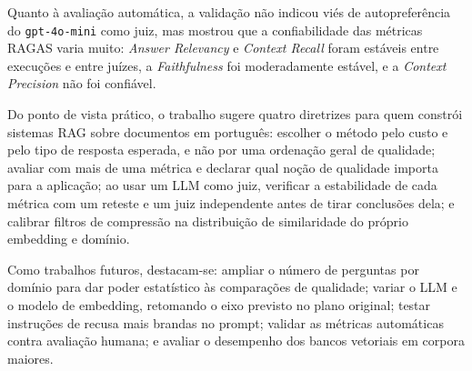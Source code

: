 Quanto à avaliação automática, a validação não indicou viés de autopreferência do \texttt{gpt-4o-mini} como juiz, mas mostrou que a confiabilidade das métricas RAGAS varia muito: \emph{Answer Relevancy} e \emph{Context Recall} foram estáveis entre execuções e entre juízes, a \emph{Faithfulness} foi moderadamente estável, e a \emph{Context Precision} não foi confiável.

Do ponto de vista prático, o trabalho sugere quatro diretrizes para quem constrói sistemas RAG sobre documentos em português: escolher o método pelo custo e pelo tipo de resposta esperada, e não por uma ordenação geral de qualidade; avaliar com mais de uma métrica e declarar qual noção de qualidade importa para a aplicação; ao usar um LLM como juiz, verificar a estabilidade de cada métrica com um reteste e um juiz independente antes de tirar conclusões dela; e calibrar filtros de compressão na distribuição de similaridade do próprio embedding e domínio.

Como trabalhos futuros, destacam-se: ampliar o número de perguntas por domínio para dar poder estatístico às comparações de qualidade; variar o LLM e o modelo de embedding, retomando o eixo previsto no plano original; testar instruções de recusa mais brandas no prompt; validar as métricas automáticas contra avaliação humana; e avaliar o desempenho dos bancos vetoriais em corpora maiores.
